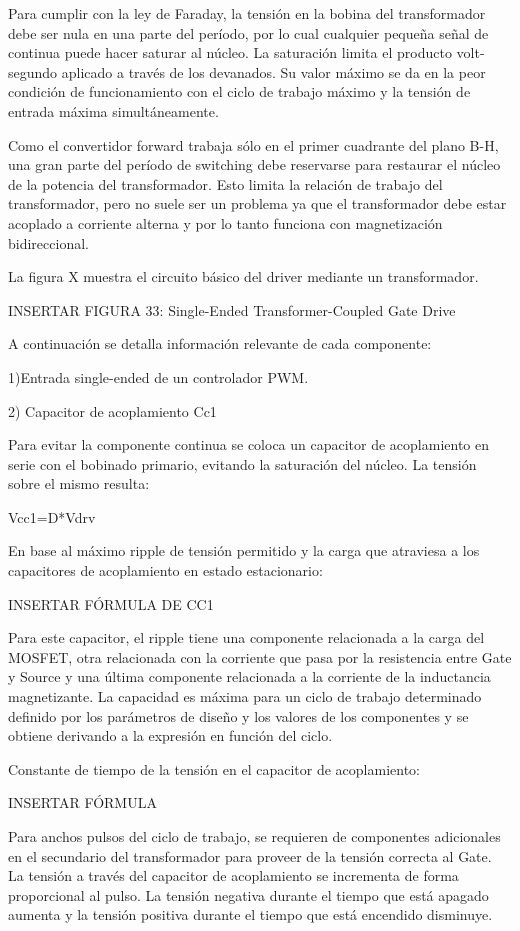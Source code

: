 Para cumplir con la ley de Faraday, la tensión en la bobina del transformador debe ser nula en una parte del período, 
por lo cual cualquier pequeña señal de continua puede hacer saturar al núcleo. 
La saturación limita el producto volt-segundo aplicado a través de los devanados. 
Su valor máximo se da en la peor condición de funcionamiento con el ciclo de trabajo máximo y la tensión de entrada máxima simultáneamente. 

Como el convertidor forward trabaja sólo en el primer cuadrante del plano B-H, una gran parte del período de switching debe reservarse para restaurar el núcleo de la potencia del transformador. 
Esto limita la relación de trabajo del transformador, pero no suele ser un problema ya que 
el transformador debe estar acoplado a corriente alterna y por lo tanto funciona con magnetización bidireccional. 

La figura X muestra el circuito básico del driver mediante un transformador. 

INSERTAR FIGURA 33: Single-Ended Transformer-Coupled Gate Drive

A continuación se detalla información relevante de cada componente: 

1)Entrada single-ended de un controlador PWM.

2) Capacitor de acoplamiento Cc1

Para evitar la componente continua se coloca un capacitor de acoplamiento en serie con el bobinado primario, 
evitando la saturación del núcleo. La tensión sobre el mismo resulta: 

Vcc1=D*Vdrv

En base al máximo ripple de tensión permitido y la carga que atraviesa a los capacitores de acoplamiento en estado estacionario:

INSERTAR FÓRMULA DE CC1

Para este capacitor, el ripple tiene una componente relacionada a la carga del MOSFET, 
otra relacionada con la corriente que pasa por la resistencia entre Gate y Source 
y una última componente relacionada a la corriente de la inductancia magnetizante. 
La capacidad es máxima para un ciclo de trabajo determinado definido por los parámetros de diseño 
y los valores de los componentes y se obtiene derivando a la expresión en función del ciclo. 

Constante de tiempo de la tensión en el capacitor de acoplamiento:

INSERTAR FÓRMULA

Para anchos pulsos del ciclo de trabajo, se requieren de componentes adicionales 
en el secundario del transformador para proveer de la tensión correcta al Gate. 
La tensión a través del capacitor de acoplamiento se incrementa de forma proporcional al pulso. 
La tensión negativa durante el tiempo que está apagado aumenta y la tensión positiva durante el tiempo que está encendido disminuye. 

